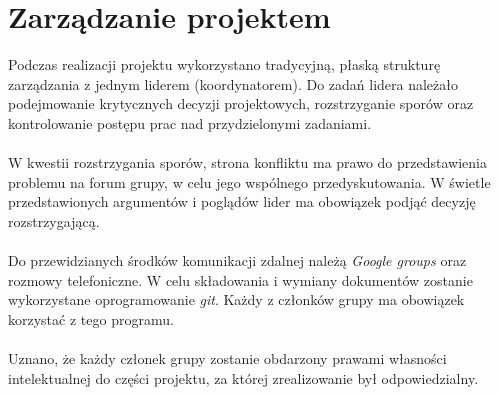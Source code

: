 \section{Zarządzanie projektem}
\noindent Podczas realizacji projektu wykorzystano tradycyjną, płaską strukturę
zarządzania z jednym liderem (koordynatorem). Do zadań lidera należało
podejmowanie krytycznych decyzji projektowych, rozstrzyganie sporów
oraz kontrolowanie postępu prac nad przydzielonymi zadaniami.
\\\\
\noindent W kwestii rozstrzygania sporów, strona konfliktu ma prawo do
przedstawienia problemu na forum grupy, w celu jego wspólnego
przedyskutowania. W świetle przedstawionych argumentów i poglądów
lider ma obowiązek podjąć decyzję rozstrzygającą.
\\\\
\noindent Do przewidzianych środków komunikacji zdalnej należą \textit{Google
groups} oraz rozmowy telefoniczne. W celu składowania i
wymiany dokumentów zostanie wykorzystane oprogramowanie \textit{git}.
Każdy z członków grupy ma obowiązek korzystać z tego programu.
\\\\
\noindent Uznano, że każdy członek grupy zostanie obdarzony prawami własności
intelektualnej do części projektu, za której zrealizowanie był odpowiedzialny.
